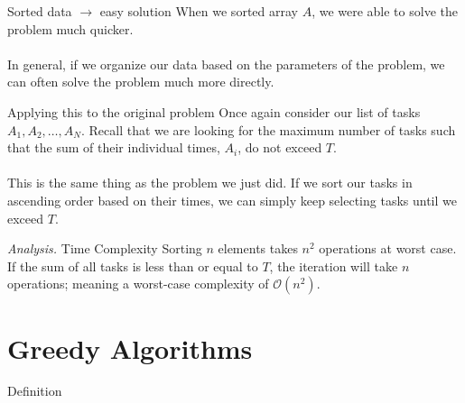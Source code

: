 \documentclass{beamer}
\begin{document}
\begin{frame}{Sorted data $\rightarrow$ easy solution}
    When we sorted array $A$, we were able to solve the problem much quicker.\\~\\
    
    In general, if we organize our data based on the parameters of the problem, we can often solve the problem much more directly.
\end{frame}

\begin{frame}{Applying this to the original problem}
    Once again consider our list of tasks $A_1,A_2,\ldots,A_N$. Recall that we are looking for the maximum number of tasks such that the sum of their individual times, $A_i$, do not exceed $T$.\\~\\
    This is the same thing as the problem we just did. If we sort our tasks in ascending order based on their times, we can simply keep selecting tasks until we exceed $T$.
    \begin{block}{\textit{Analysis.} Time Complexity}
        Sorting $n$ elements takes $n^2$ operations at worst case. If the sum of all tasks is less than or equal to $T$, the iteration will take $n$ operations; meaning a worst-case complexity of $\mathcal{O}(n^2)$.
    \end{block}
\end{frame}

\section{Greedy Algorithms}
\begin{frame}{Definition}
    
\end{frame}
\end{document}
